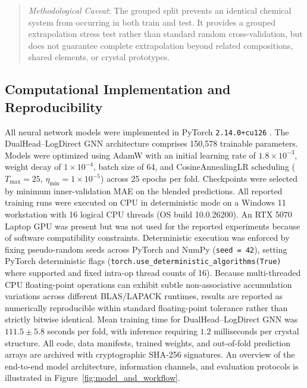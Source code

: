 \documentclass[final,3p,times]{elsarticle}
\begin{document}
\begin{quote}
\small
\textit{Methodological Caveat}: The grouped split prevents an identical chemical system from occurring in both train and test. It provides a grouped extrapolation stress test rather than standard random cross-validation, but does not guarantee complete extrapolation beyond related compositions, shared elements, or crystal prototypes.
\end{quote}

\subsection{Computational Implementation and Reproducibility}
All neural network models were implemented in PyTorch \texttt{2.14.0+cu126} \cite{paszke2019pytorch}. The DualHead--LogDirect GNN architecture comprises 150,578 trainable parameters. Models were optimized using AdamW \cite{kingma2014adam, loshchilov2017decoupled} with an initial learning rate of $1.8 \times 10^{-3}$, weight decay of $1 \times 10^{-4}$, batch size of 64, and CosineAnnealingLR scheduling ($T_{\max}=25$, $\eta_{\min}=1 \times 10^{-5}$) across 25 epochs per fold. Checkpoints were selected by minimum inner-validation MAE on the blended predictions. All reported training runs were executed on CPU in deterministic mode on a Windows 11 workstation with 16 logical CPU threads (OS build 10.0.26200). An RTX 5070 Laptop GPU was present but was not used for the reported experiments because of software compatibility constraints. Deterministic execution was enforced by fixing pseudo-random seeds across PyTorch and NumPy (\texttt{seed = 42}), setting PyTorch deterministic flags (\texttt{torch.use\_deterministic\_algorithms(True)} where supported and fixed intra-op thread counts of 16). Because multi-threaded CPU floating-point operations can exhibit subtle non-associative accumulation variations across different BLAS/LAPACK runtimes, results are reported as numerically reproducible within standard floating-point tolerance rather than strictly bitwise identical. Mean training time for DualHead--LogDirect GNN was $111.5 \pm 5.8$ seconds per fold, with inference requiring $1.2$ milliseconds per crystal structure. All code, data manifests, trained weights, and out-of-fold prediction arrays are archived with cryptographic SHA-256 signatures. An overview of the end-to-end model architecture, information channels, and evaluation protocols is illustrated in Figure~\ref{fig:model_and_workflow}.
\end{document}
